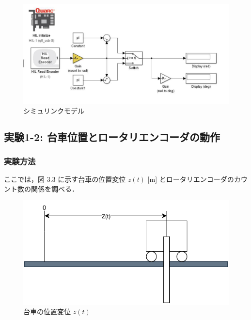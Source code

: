 \begin{figure}[h]
  \centering
  \includegraphics[scale=0.9]{sozai/pendcount3.pdf}
  \caption{シミュリンクモデル}
\end{figure}


\subsection{実験1-2: 台車位置とロータリエンコーダの動作}

\subsubsection{実験方法}
ここでは，図 3.3 に示す台車の位置変位 \( z(t) \) [m] とロータリエンコーダのカウント数の関係を調べる．

\begin{figure}[h]
  \centering
  \includegraphics[scale=1]{sozai/daisyanoichihenni.pdf}
  \caption{台車の位置変位 \( z(t) \)}
\end{figure}


